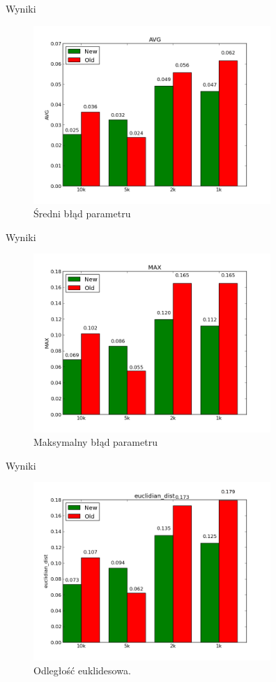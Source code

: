 \documentclass{beamer}
\begin{document}
\begin{frame}{Wyniki}
	\begin{figure}[h!]
		\centering
		\includegraphics[width=9cm]{avg.png}
		\caption{Średni błąd parametru}
	\end{figure}
\end{frame}

\begin{frame}{Wyniki}
	\begin{figure}[h!]
		\centering
		\includegraphics[width=9cm]{max.png}
		\caption{Maksymalny błąd parametru}
	\end{figure}
\end{frame}

\begin{frame}{Wyniki}
	\begin{figure}[h!]
		\centering
		\includegraphics[width=9cm]{euclidian_dist.png}
		\caption{Odległość euklidesowa.}
	\end{figure}
\end{frame}
\end{document}
